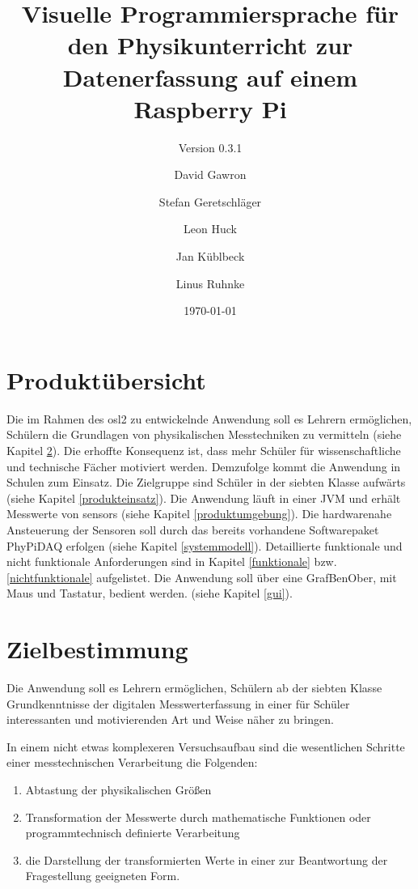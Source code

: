 \documentclass[parskip=full]{scrartcl}
\title{Visuelle Programmiersprache für den Physikunterricht zur Datenerfassung auf einem Raspberry Pi}
\subtitle{Version 0.3.1} %
\author{David Gawron \and Stefan Geretschläger \and Leon Huck \and Jan Küblbeck \and Linus Ruhnke}
\date{\today}
\begin{document}
\maketitle

\clearpage
\tableofcontents 					%

\clearpage
\section{Produktübersicht} %

Die im Rahmen des \gls{osl2} zu entwickelnde Anwendung soll es Lehrern ermöglichen, Schülern die Grundlagen von physikalischen Messtechniken zu vermitteln (siehe Kapitel \ref{zielbestimmung}). Die erhoffte Konsequenz ist, dass mehr Schüler für wissenschaftliche und technische Fächer motiviert werden.
Demzufolge kommt die Anwendung in Schulen zum Einsatz. 
Die Zielgruppe sind Schüler in der siebten Klasse aufwärts (siehe Kapitel \ref{produkteinsatz}).
Die Anwendung läuft in einer \gls{JVM} und erhält Messwerte von \glspl{sensor} (siehe Kapitel \ref{produktumgebung}). 
Die hardwarenahe Ansteuerung der Sensoren soll durch das bereits vorhandene Softwarepaket \gls{PhyPiDAQ} erfolgen (siehe Kapitel \ref{systemmodell}).
Detaillierte funktionale und nicht funktionale Anforderungen sind in Kapitel \ref{funktionale} bzw. \ref{nichtfunktionale} aufgelistet.
Die Anwendung soll über eine \gls{GrafBenOber}, mit Maus und Tastatur, bedient werden. (siehe Kapitel \ref{gui}).

\clearpage
\section{Zielbestimmung}\label{zielbestimmung}

Die Anwendung soll es Lehrern ermöglichen, Schülern ab der siebten Klasse Grundkenntnisse der digitalen Messwerterfassung in einer für Schüler interessanten und motivierenden Art und Weise näher zu bringen. 

In einem nicht etwas komplexeren Versuchsaufbau sind die wesentlichen Schritte einer messtechnischen Verarbeitung die Folgenden: 

\begin{enumerate}
	\item Abtastung der physikalischen Größen
	
	\item Transformation der Messwerte durch mathematische Funktionen oder programmtechnisch definierte Verarbeitung
	
	\item die Darstellung der transformierten Werte in einer zur Beantwortung der Fragestellung geeigneten Form.
	
\end{enumerate}
\end{document}
